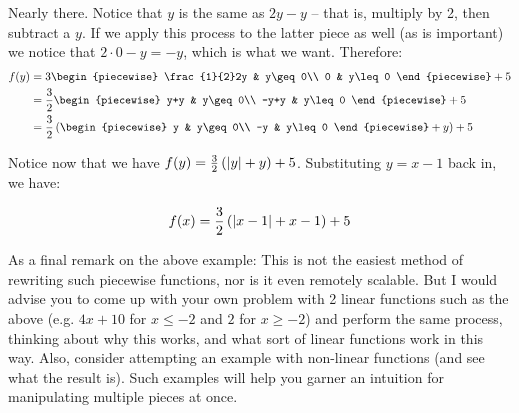 \begin{example}[continued]
    Nearly there. Notice that $y$ is the same as $2y-y$ -- that is, multiply by 2, then subtract a $y$. If we apply this process to the latter piece as well (as is important) we notice that $2\cdot 0-y=-y$, which is what we want. Therefore:
    \begin{align*}
        f(y) &= 3\begin{piecewise}
            \frac{1}{2}2y & y\geq 0\\
            0 & y\leq 0
        \end{piecewise}+5\\
        &= \frac{3}{2}\begin{piecewise}
            y+y & y\geq 0\\
            -y+y & y\leq 0
        \end{piecewise}+5 \\
        &= \frac{3}{2}\left(\begin{piecewise}
            y & y\geq 0\\
            -y & y\leq 0
        \end{piecewise}+y\right)+5
    \end{align*}

    Notice now that we have $f(y)=\frac{3}{2}\left(\abs{y}+y\right)+5$. Substituting $y=x-1$ back in, we have:

    $$
        f(x)=\frac{3}{2}\left(\abs{x-1}+x-1\right)+5
    $$
\end{example}

As a final remark on the above example: This is not the easiest method of rewriting such piecewise functions, nor is it even remotely scalable. But I would advise you to come up with your own problem with 2 linear functions such as the above (e.g. $4x+10$ for $x\leq -2$ and $2$ for $x\geq -2$) and perform the same process, thinking about why this works, and what sort of linear functions work in this way. Also, consider attempting an example with non-linear functions (and see what the result is). Such examples will help you garner an intuition for manipulating multiple pieces at once.
\newpage
